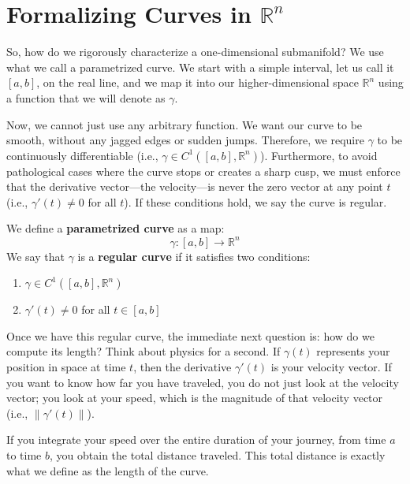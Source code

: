 
\section{Formalizing Curves in \texorpdfstring{$\mathbb{R}^n$}{Rn}}

\begin{spoken-clean}[03:50 - 05:20]
So, how do we rigorously characterize a one-dimensional submanifold? We use what we call a parametrized curve. We start with a simple interval, let us call it $[a, b]$, on the real line, and we map it into our higher-dimensional space $\mathbb{R}^n$ using a function that we will denote as $\gamma$. 

Now, we cannot just use any arbitrary function. We want our curve to be smooth, without any jagged edges or sudden jumps. Therefore, we require $\gamma$ to be continuously differentiable (i.e., $\gamma \in C^1([a, b], \mathbb{R}^n)$). Furthermore, to avoid pathological cases where the curve stops or creates a sharp cusp, we must enforce that the derivative vector—the velocity—is never the zero vector at any point $t$ (i.e., $\gamma'(t) \neq 0$ for all $t$). If these conditions hold, we say the curve is regular.
\end{spoken-clean}

\begin{math-stroke}
We define a \textbf{parametrized curve} as a map:
\[
\gamma: [a, b] \to \mathbb{R}^n
\]
We say that $\gamma$ is a \textbf{regular curve} if it satisfies two conditions:
\begin{enumerate}
    \item $\gamma \in C^1([a, b], \mathbb{R}^n)$ 
    \item $\gamma'(t) \neq 0$ for all $t \in [a, b]$ 
\end{enumerate}
\end{math-stroke}

\begin{spoken-clean}[05:20 - 07:15]
Once we have this regular curve, the immediate next question is: how do we compute its length? Think about physics for a second. If $\gamma(t)$ represents your position in space at time $t$, then the derivative $\gamma'(t)$ is your velocity vector. If you want to know how far you have traveled, you do not just look at the velocity vector; you look at your speed, which is the magnitude of that velocity vector (i.e., $\|\gamma'(t)\|$).

If you integrate your speed over the entire duration of your journey, from time $a$ to time $b$, you obtain the total distance traveled. This total distance is exactly what we define as the length of the curve.
\end{spoken-clean}

